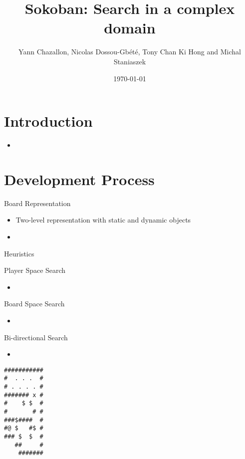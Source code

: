\documentclass{beamer}
\title[Sokoban] %
{Sokoban: Search in a complex domain}
\author[Chazallon, Dossou-Gb{\'e}t{\'e}, Hong, Staniaszek]{Yann Chazallon,  Nicolas Dossou-Gb{\'e}t{\'e}, Tony Chan Ki Hong and Michal Staniaszek}
\date{\today}
\begin{document}
\begin{frame}
  \titlepage
\end{frame}

\section{Introduction}

\begin{frame}
  \begin{itemize}
    \item
  \end{itemize}
\end{frame} 

\section{Development Process}

\begin{frame}{Board Representation}
  \begin{itemize}
    \item Two-level representation with static and dynamic objects
    \item 
  \end{itemize}
\end{frame}

\begin{frame}{Heuristics}
  
\end{frame}

\begin{frame}{Player Space Search}
  \begin{itemize}
  \item
  \end{itemize}
\end{frame}

\begin{frame}{Board Space Search}
  \begin{itemize}
  \item
  \end{itemize}
\end{frame}

\begin{frame}{Bi-directional Search}
  \begin{itemize}
  \item
  \end{itemize}
\end{frame}

\begin{lrbox}{\mapff}
  \begin{minipage}{.25\textwidth}
\centering
\begin{BVerbatim}
###########
#  . . .  #
# . . . . #
####### x #
#    $ $  #
#       # #
###$####  #
#@ $   #$ #
### $  $  #
   ##     #
    #######  
\end{BVerbatim}
  \end{minipage}
\end{lrbox}%
\end{document}
